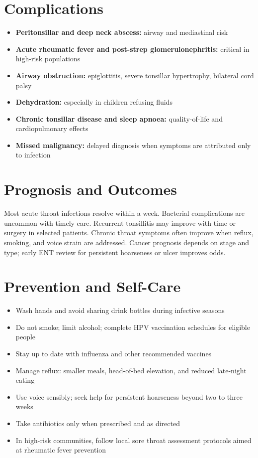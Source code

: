 \section*{Complications}
\begin{itemize}
    \item \textbf{Peritonsillar and deep neck abscess:} airway and mediastinal risk
    \item \textbf{Acute rheumatic fever and post-strep glomerulonephritis:} critical in high-risk populations
    \item \textbf{Airway obstruction:} epiglottitis, severe tonsillar hypertrophy, bilateral cord palsy
    \item \textbf{Dehydration:} especially in children refusing fluids
    \item \textbf{Chronic tonsillar disease and sleep apnoea:} quality-of-life and cardiopulmonary effects
    \item \textbf{Missed malignancy:} delayed diagnosis when symptoms are attributed only to infection
\end{itemize}

\section*{Prognosis and Outcomes}
Most acute throat infections resolve within a week. Bacterial complications are uncommon with timely care. Recurrent tonsillitis may improve with time or surgery in selected patients. Chronic throat symptoms often improve when reflux, smoking, and voice strain are addressed. Cancer prognosis depends on stage and type; early ENT review for persistent hoarseness or ulcer improves odds.

\section*{Prevention and Self-Care}
\begin{itemize}
    \item Wash hands and avoid sharing drink bottles during infective seasons
    \item Do not smoke; limit alcohol; complete HPV vaccination schedules for eligible people
    \item Stay up to date with influenza and other recommended vaccines
    \item Manage reflux: smaller meals, head-of-bed elevation, and reduced late-night eating
    \item Use voice sensibly; seek help for persistent hoarseness beyond two to three weeks
    \item Take antibiotics only when prescribed and as directed
    \item In high-risk communities, follow local sore throat assessment protocols aimed at rheumatic fever prevention
\end{itemize}

